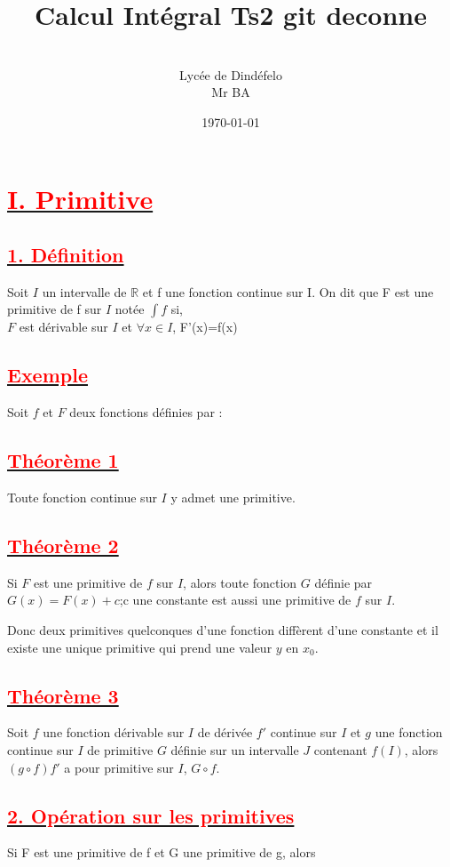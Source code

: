 \documentclass[12pt]{article}
\author{\\Lycée de Dindéfelo\\Mr BA}
\title{\textbf{Calcul Intégral Ts2 git deconne}}
\date{\today}
\begin{document}
\maketitle
\newpage
\section*{\underline{\textbf{\textcolor{red}{I. Primitive }}}}
\subsection*{\underline{\textbf{\textcolor{red}{1. Définition}}}}
Soit $I$ un intervalle de $\mathbb{R}$  et  f une fonction continue sur I. On dit que F est une primitive de f sur $I$ notée $\int f $ si,\\ $F$ est dérivable sur $I$ et $\forall x \in I$, F'(x)=f(x)
\subsection*{\underline{\textbf{\textcolor{red}{Exemple}}}}
Soit $f$  et  $F$ deux fonctions définies par : 
\subsection*{\underline{\textbf{\textcolor{red}{Théorème 1}}}}
Toute fonction continue sur $I$ y admet une primitive.
\subsection*{\underline{\textbf{\textcolor{red}{Théorème 2}}}}
Si $F$ est une primitive de $f$ sur $I$, alors toute fonction $G$ définie par
$G(x)=F(x)+c$;c une constante est aussi une primitive de $f$ sur $I$.
 
Donc deux primitives quelconques d'une fonction diffèrent d'une constante et il existe une unique primitive qui prend une valeur $y$ en $x_{0}$.
\subsection*{\underline{\textbf{\textcolor{red}{Théorème 3}}}}

Soit $f$ une fonction dérivable sur $I$ de dérivée $f'$ continue sur $I$ et $g$ une fonction continue sur $I$ de primitive $G$ définie sur un intervalle $J$ contenant $f(I)$, alors $(g\circ f)f'$ a pour primitive sur $I$, $G\circ f$.
\subsection*{\underline{\textbf{\textcolor{red}{2. Opération sur les primitives}}}}
Si F est une primitive de f et G une primitive de g, alors 
\end{document}
